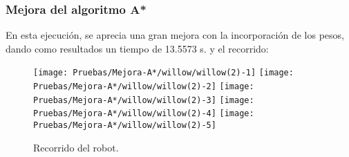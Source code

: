 \documentclass[a4paper, 11pt]{article}
\begin{document}
		\subsubsection{Mejora del algoritmo A*}
			En esta ejecución, se aprecia una gran mejora con la incorporación de los pesos, dando como
			resultados un tiempo de 13.5573 s. y el recorrido: 
			
			\begin{figure}[H]
				\centering
				\texttt{[image: Pruebas/Mejora-A*/willow/willow(2)-1]}
				\texttt{[image: Pruebas/Mejora-A*/willow/willow(2)-2]}
				\texttt{[image: Pruebas/Mejora-A*/willow/willow(2)-3]}
				\texttt{[image: Pruebas/Mejora-A*/willow/willow(2)-4]}
				\texttt{[image: Pruebas/Mejora-A*/willow/willow(2)-5]}
				\caption{Recorrido del robot.}
				\label{MA-wil}
			\end{figure}
	
\end{document}
